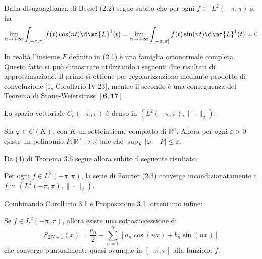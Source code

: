 \begin{oss}
    Dalla disuguaglianza di Bessel (2.2) segue subito che per ogni $f \in$ $L^{2}(-\pi, \pi)$ si ha
    \[
    \lim _{n \rightarrow+\infty} \int_{[-\pi, \pi]} f(t) \cos (n t) \d \mc{L}^{1}(t)=\lim _{n \rightarrow+\infty} \int_{[-\pi, \pi]} f(t) \sin (n t) \d \mc{L}^{1}(t)=0
    \]
\end{oss}

In realtà l'insieme $F$ definito in (2.1) è una famiglia ortonormale completa. Questo fatto si può dimostrare utilizzando i seguenti due risultati di approssimazione. Il primo si ottiene per regolarizzazione mediante prodotto di convoluzione [1, Corollario IV.23], mentre il secondo è una conseguenza del Teorema di Stone-Weierstrass $[\mathbf{6}, \mathbf{1 7}]$.

\begin{shadedTheorem}
    Lo spazio vettoriale $C_{c}(-\pi, \pi)$ è denso in $\left(L^{2}(-\pi, \pi),\|\cdot\|_{2}\right)$.
\end{shadedTheorem}

\begin{shadedTheorem}
    Sia $\varphi \in C(K)$, con $K$ un sottoinsieme compatto di $\mathbb{R}^{n}$. Allora per ogni $\varepsilon>0$ esiste un polinomio $P: \mathbb{R}^{n} \rightarrow \mathbb{R}$ tale che $\sup _{K}|\varphi-P| \leq \varepsilon$.
\end{shadedTheorem}
Da (4) di Teorema 3.6 segue allora subito il seguente risultato.

\begin{corollary}[$\circ$]
    Per ogni $f \in L^{2}(-\pi, \pi)$, la serie di Fourier (2.3) converge incondizionatamente a $f$ in $\left(L^{2}(-\pi, \pi),\|\cdot\|_{2}\right)$.
\end{corollary}
Combinando Corollario 3.1 e Proposizione 3.1, otteniamo infine:

\begin{corollary}[$\circ$]
    Se $f \in L^{2}(-\pi, \pi)$, allora esiste una sottosuccessione di
    \begin{equation}
    S_{2 N+1}(x)=\frac{a_{0}}{2}+\sum_{n=1}^{N}\left[a_{n} \cos (n x)+b_{n} \sin (n x)\right] \tag{2.4}
    \end{equation}
    che converge puntualmente quasi ovunque in $[-\pi, \pi]$ alla funzione $f$.
\end{corollary}

